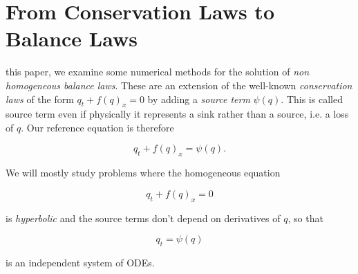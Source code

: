 \documentclass[journal,onecolumn]{IEEEtran}
\begin{document}
\section{From Conservation Laws to Balance Laws}
 this paper, we examine some numerical methods for the solution of \textit{non homogeneous balance laws}. These are an extension of the well-known \textit{conservation laws} of the form $q_t+f(q)_x=0$ by adding a \textit{source term} $\psi(q)$. This is called source term even if physically it represents a sink rather than a source, i.e. a loss of $q$. Our reference equation is therefore

\begin{equation} \label{eq:template}
	q_t + f(q)_x = \psi(q).
\end{equation}

We will mostly study problems where the homogeneous equation

\begin{equation} \label{eq:hom}
	q_t +f(q)_x = 0
\end{equation}

is \textit{hyperbolic} and the source terms don't depend on derivatives of $q$, so that

\begin{equation} \label{eq:source}
	q_t = \psi(q)
\end{equation}

is an independent system of ODEs.


%
%
\end{document}
